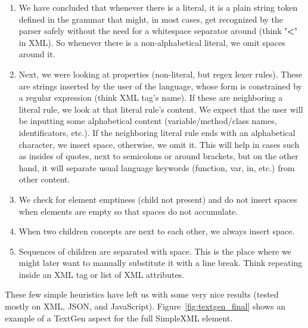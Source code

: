 \begin{enumerate}
	\item We have concluded that whenever there is a literal, it is a plain string token defined in the grammar that might, in most cases, get recognized by the parser safely without the need for a whitespace separator around (think \textbf{'\textless'} in XML).
	So whenever there is a non-alphabetical literal, we omit spaces around it.

	\item Next, we were looking at properties (non-literal, but regex lexer rules).
	These are strings inserted by the user of the language, whose form is constrained by a regular expression (think XML tag's name).
	If these are neighboring a literal rule, we look at that literal rule's content.
	We expect that the user will be inputting some alphabetical content (variable/method/class names, identificators, etc.).
	If the neighboring literal rule ends with an alphabetical character, we insert space, otherwise, we omit it.
	This will help in cases such as insides of quotes, next to semicolons or around brackets, but on the other hand, it will separate usual language keywords (function, var, in, etc.) from other content.

	\item We check for element emptiness (child not present) and do not insert spaces when elements are empty so that spaces do not accumulate.

	\item When two children concepts are next to each other, we always insert space.

	\item Sequences of children are separated with space.
	This is the place where we might later want to manually substitute it with a line break.
	Think repeating  inside an XML tag or list of XML attributes.
\end{enumerate}

These few simple heuristics have left us with some very nice results (tested mostly on XML, JSON, and JavaScript). Figure~\ref{fig:textgen_final} shows an example of a TextGen aspect for the full SimpleXML element.
\\

